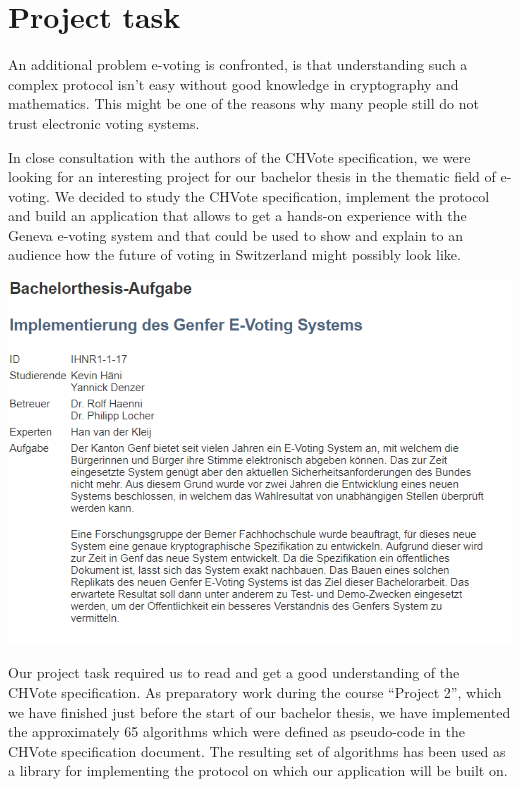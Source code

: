 \section{Project task}
An additional problem e-voting is confronted, is that understanding such a complex protocol isn't easy without good knowledge in cryptography and mathematics. This might be one of the reasons why many people still do not trust electronic voting systems. 

In close consultation with the authors of the CHVote specification, we were looking for an interesting project for our bachelor thesis in the thematic field of e-voting. We decided to study the CHVote specification, implement the protocol and build an application that allows to get a hands-on experience with the Geneva e-voting system and that could be used to show and explain to an audience how the future of voting in Switzerland might possibly look like.

\begin{center}
\includegraphics[scale=0.95]{assets/aufgabe.PNG}
\label{Bachelor thesis task}%
\end{center}

Our project task required us to read and get a good understanding of the CHVote specification. As preparatory work during the course "`Project 2"', which we have finished just before the start of our bachelor thesis, we have implemented the approximately 65 algorithms which were defined as pseudo-code in the CHVote specification document. The resulting set of algorithms has been used as a library for implementing the protocol on which our application will be built on.


